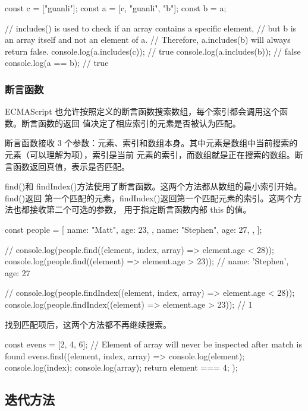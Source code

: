 \begin{js}
    const c = ["guanli"];
    const a = [c, "guanli", "b"];
    const b = a;

    // includes() is used to check if an array contains a specific element,
    // but b is an array itself and not an element of a.
    // Therefore, a.includes(b) will always return false.
    console.log(a.includes(c)); // true
    console.log(a.includes(b)); // false
    console.log(a == b); // true
\end{js}
\subsubsection{断言函数}
ECMAScript 也允许按照定义的断言函数搜索数组，每个索引都会调用这个函数。断言函数的返回
值决定了相应索引的元素是否被认为匹配。

断言函数接收 3 个参数：元素、索引和数组本身。其中元素是数组中当前搜索的元素（可以理解为项），索引是当前
元素的索引，而数组就是正在搜索的数组。断言函数返回真值，表示是否匹配。

find()和 findIndex()方法使用了断言函数。这两个方法都从数组的最小索引开始。find()返回
第一个匹配的元素，findIndex()返回第一个匹配元素的索引。这两个方法也都接收第二个可选的参数，
用于指定断言函数内部 this 的值。
\begin{js}
    const people = [
    {
            name: "Matt",
            age: 23,
        },
    {
            name: "Stephen",
            age: 27,
        },
    ];

    // console.log(people.find((element, index, array) => element.age < 28));
    console.log(people.find((element) => element.age > 23)); // {name: 'Stephen', age: 27}

    // console.log(people.findIndex((element, index, array) => element.age < 28));
    console.log(people.findIndex((element) => element.age > 23)); // 1
\end{js}

找到匹配项后，这两个方法都不再继续搜索。

\begin{js}
    const evens = [2, 4, 6];
    // Element of array will never be inspected after match is found
    evens.find((element, index, array) => {
    console.log(element);
    console.log(index);
    console.log(array);
    return element === 4;
    });
\end{js}
\subsection{迭代方法}
